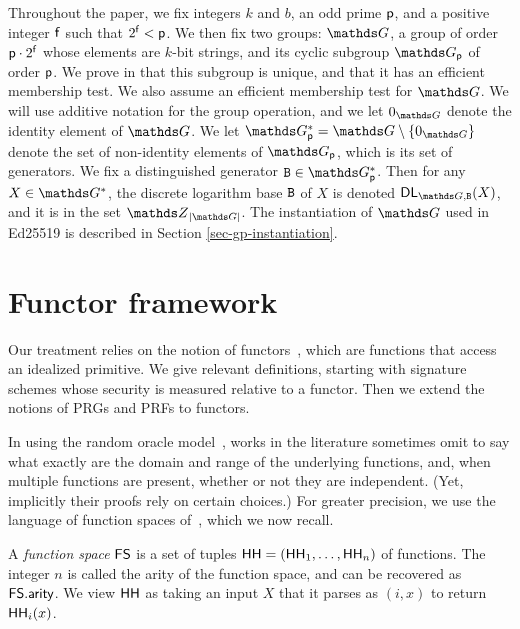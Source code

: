 
 Throughout the paper, we fix integers $k$ and $b$, an odd prime $\mathsf{p}$, and a positive integer $\mathsf{f}$ such that $2^{\mathsf{f}} < \mathsf{p}$. 
We then fix two groups: $\G$, a group of order $\mathsf{p} \cdot 2^{\mathsf{f}}$ whose elements are $k$-bit strings, and its cyclic subgroup $\G_{\Prime}$ of order $\mathsf{p}$. 
We prove in  that this subgroup is unique, and that it has an efficient membership test. 
We also assume an efficient membership test for $\G$. 
We will use additive notation for the group operation, and we let $0_{\G}$ denote the identity element of $\G$. 
We let $\G_{\Prime}^*=\G\setminus\{0_{\G}\}$ denote the set of non-identity elements of $\G_{\Prime}$, which is its set of generators. 
We fix a distinguished generator $\generatorEDSA \in \G_{\Prime}^*$. 
Then for any $X \in \G^{*}$, the discrete logarithm base $\mathtt{B}$ of $X$ is denoted $\DL_{\G, \generatorEDSA}(X)$, and it is in the set $\Z_{|\G|}$.
The instantiation of $\G$ used in Ed25519 is described in Section \ref{sec-gp-instantiation}.

\section{Functor framework}\label{sec-our-def-framework}

Our treatment relies on the notion of functors~\cite{EC:BelDavGun20}, which are functions that access an idealized primitive. We give relevant definitions, starting with signature schemes whose security is measured relative to a functor. Then we extend the notions of PRGs and PRFs to functors.

 In using the random oracle model~\cite{CCS:BelRog93}, works in the literature sometimes omit to say what exactly are the domain and range of the underlying functions, and, when multiple functions are present, whether or not they are independent. (Yet, implicitly their proofs rely on certain choices.) For greater precision, we use the language of function spaces of~\cite{EC:BelDavGun20}, which we now recall. 

A \textit{function space} $\mathsf{FS}$ is a set of tuples $\mathsf{HH}=(\mathsf{HH}_1,\ldots,\mathsf{HH}_n)$ of functions. The integer $n$ is called the arity of the function space, and can be recovered as $\mathsf{FS}.\mathsf{arity}$. We view $\mathsf{HH}$ as taking an input $X$ that it parses as $(i,x)$ to return $\mathsf{HH}_i(x)$. 



